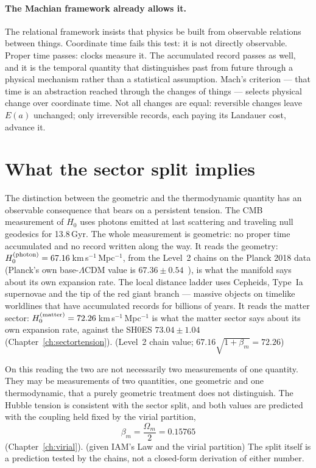 \paragraph{The Machian framework already allows it.} The relational framework insists that physics be built from observable relations between things.
Coordinate time fails this test: it is not directly observable. Proper time passes: clocks measure it. The accumulated record passes as well, and it is
the temporal quantity that distinguishes past from future through a physical mechanism rather than a statistical assumption. Mach's criterion --- that
time is an abstraction reached through the changes of things --- selects physical change over coordinate time. Not all changes are equal: reversible
changes leave $E(a)$ unchanged; only irreversible records, each paying its Landauer cost, advance it. \interp

\section{What the sector split implies}\label{sec:time_split}
The distinction between the geometric and the thermodynamic quantity has an observable consequence that bears on a persistent tension. The CMB
measurement of $H_0$ uses photons emitted at last scattering and traveling null geodesics for 13.8\,Gyr. The whole measurement is geometric: no proper
time accumulated and no record written along the way. It reads the geometry: $H_0^{(\rm photon)}=67.16$\,km\,s$^{-1}$\,Mpc$^{-1}$, from the Level~2 chains on the Planck 2018 data
(Planck's own base-$\Lambda$CDM value is $67.36\pm0.54$~\cite{Planck2018VI}), is what the manifold says about its own expansion rate. \measured{} The local distance ladder uses Cepheids, Type~Ia supernovae and the tip of the red
giant branch --- massive objects on timelike worldlines that have accumulated records for billions of years. It reads the matter sector:
$H_0^{(\rm matter)}=72.26$\,km\,s$^{-1}$\,Mpc$^{-1}$ is what the matter sector says about its own expansion rate, against the
SH0ES $73.04\pm1.04$~\cite{Riess2022} (Chapter~\ref{ch:sectortension}). \calc{} (Level~2 chain value; $67.16\sqrt{1+\beta_m}=72.26$)

On this reading the two are not necessarily two measurements of one quantity. They may be measurements of two quantities, one geometric and one
thermodynamic, that a purely geometric treatment does not distinguish. The Hubble tension is consistent with the sector split, and both values are
predicted with the coupling held fixed by the virial partition,
\begin{equation}
\beta_m=\frac{\Omega_m}{2}=0.15765\label{eq:time_betam}
\end{equation}
(Chapter~\ref{ch:virial}). \derived{} (given IAM's Law and the virial partition) The split itself is a prediction tested by the chains, not a
closed-form derivation of either number. \prediction

